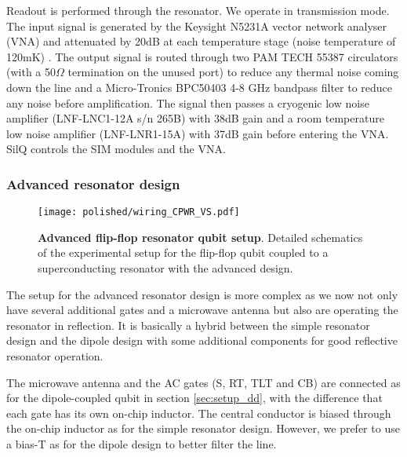 Readout is performed through the resonator. We operate in transmission mode. The input signal is generated by the Keysight N5231A vector network analyser (VNA) and attenuated by 20dB at each temperature stage (noise temperature of 120mK) .
The output signal is routed through two PAM TECH 55387 circulators (with a 50$\Omega$ termination on the unused port) to reduce any thermal noise coming down the line and a Micro-Tronics BPC50403 4-8 GHz bandpass filter to reduce any noise before amplification. The signal then passes a cryogenic low noise amplifier (LNF-LNC1-12A s/n 265B) with 38dB gain and a room temperature low noise amplifier (LNF-LNR1-15A) with 37dB gain before entering the VNA. SilQ controls the SIM modules and the VNA. 

\subsubsection{Advanced resonator design}

\begin{figure}
	\centering
	\texttt{[image: polished/wiring\_CPWR\_VS.pdf]}
	\caption[Advanced flip-flop resonator qubit setup]{\textbf{Advanced flip-flop resonator qubit setup}. Detailed schematics of the experimental setup for the flip-flop qubit coupled to a superconducting resonator with the advanced design.  }
	\label{fig:resonator_setup_new}
\end{figure}

The setup for the advanced resonator design is more complex as we now not only have several additional gates and a microwave antenna but also are operating the resonator in reflection. It is basically a hybrid between the simple resonator design and the dipole design with some additional components for good reflective resonator operation.

The microwave antenna and the AC gates (S, RT, TLT and CB) are connected as for the dipole-coupled qubit in section \ref{sec:setup_dd}, with the difference that each gate has its own on-chip inductor.  
The central conductor is biased through the on-chip inductor as for the simple resonator design. However, we prefer to use a bias-T as for the dipole design to better filter the line. 

